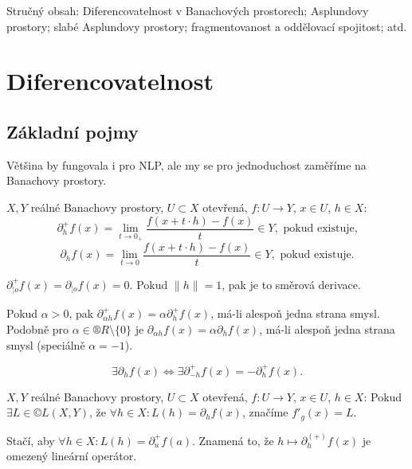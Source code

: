\documentclass[12pt]{article}					%
\begin{document}
\begin{poznamka}
	Stručný obsah: Diferencovatelnost v Banachových prostorech; Asplundovy prostory; slabé Asplundovy prostory; fragmentovanost a oddělovací spojitost; atd.
\end{poznamka}

\section{Diferencovatelnost}
\subsection{Základní pojmy}

\begin{poznamka}
	Většina by fungovala i pro NLP, ale my se pro jednoduchost zaměříme na Banachovy prostory.
\end{poznamka}

\begin{definice}
	$X, Y$ reálné Banachovy prostory, $U \subset X$ otevřená, $f: U \rightarrow Y$, $x \in U$, $h \in X$:
	$$ \partial_h^+ f(x) = \lim_{t \rightarrow 0_+} \frac{f(x + t·h) - f(x)}{t} \in Y, \text{ pokud existuje,} $$
	$$ \partial_h f(x) = \lim_{t \rightarrow 0} \frac{f(x + t·h) - f(x)}{t} \in Y, \text{ pokud existuje}. $$

	\begin{poznamkain}
		$\partial_{¦o}^+ f(x) = \partial_{¦o} f(x) = 0$. Pokud $\|h\| = 1$, pak je to směrová derivace.

		Pokud $\alpha > 0$, pak $\partial_{\alpha h}^+ f(x) = \alpha \partial_h^+ f(x)$, má-li alespoň jedna strana smysl. Podobně pro $\alpha \in ®R \setminus \{0\}$ je $\partial_{\alpha h} f(x) = \alpha \partial_h f(x)$, má-li alespoň jedna strana smysl (speciálně $\alpha = -1$).

		$$ \exists \partial_h f(x) \Leftrightarrow \exists \partial_{-h}^+ f(x) = - \partial_h^+ f(x). $$
	\end{poznamkain}
\end{definice}

\begin{definice}
	$X, Y$ reálné Banachovy prostory, $U \subset X$ otevřená, $f: U \rightarrow Y$, $x \in U$, $h \in X$: Pokud $\exists L \in ©L(X, Y)$, že $\forall h \in X: L(h) = \partial_h f(x)$, značíme $f'_g(x) = L$.

	\begin{poznamkain}
		Stačí, aby $\forall h \in X: L(h) = \partial_u^+ f(a)$. Znamená to, že $h \mapsto \partial_h^{(+)} f(x)$ je omezený lineární operátor.
	\end{poznamkain}
\end{definice}
\end{document}
